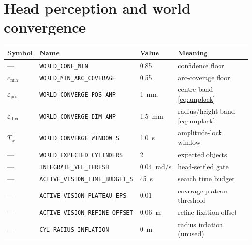 \section{Head perception and world convergence}
\begin{tabularx}{\linewidth}{@{}l>{\scriptsize}ll>{\raggedright\arraybackslash}X@{}}
\toprule
Symbol & Name & Value & Meaning \\
\midrule
--- & \texttt{WORLD\_CONF\_MIN} & 0.85 & confidence floor \\
$c_{\min}$ & \texttt{WORLD\_MIN\_ARC\_COVERAGE} & 0.55 & arc-coverage floor \\
$\varepsilon_{\text{pos}}$ & \texttt{WORLD\_CONVERGE\_POS\_AMP} & 1~mm & centre band \eqref{eq:amplock} \\
$\varepsilon_{\text{dim}}$ & \texttt{WORLD\_CONVERGE\_DIM\_AMP} & 1.5~mm & radius/height band \eqref{eq:amplock} \\
$T_w$ & \texttt{WORLD\_CONVERGE\_WINDOW\_S} & 1.0~s & amplitude-lock window \\
--- & \texttt{WORLD\_EXPECTED\_CYLINDERS} & 2 & expected objects \\
--- & \texttt{INTEGRATE\_VEL\_THRESH} & 0.04~rad/s & head-settled gate \\
--- & \texttt{ACTIVE\_VISION\_TIME\_BUDGET\_S} & 45~s & search time budget \\
--- & \texttt{ACTIVE\_VISION\_PLATEAU\_EPS} & 0.01 & coverage plateau threshold \\
--- & \texttt{ACTIVE\_VISION\_REFINE\_OFFSET} & 0.06~m & refine fixation offset \\
--- & \texttt{CYL\_RADIUS\_INFLATION} & 0~m & radius inflation (unused) \\
\bottomrule
\end{tabularx}

